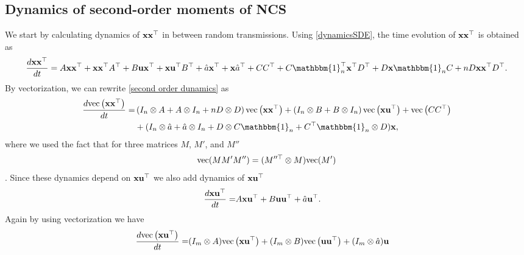 \documentclass[letterpaper, 10 pt,one column, conference]{ieeeconf}  %
\begin{document}
\subsection{Dynamics of second-order moments of NCS}
We start by calculating dynamics of $\bold x \bold x^\top$ in between random transmissions.
Using \eqref{dynamicsSDE}, the time evolution of $\bold x \bold x^\top$ is obtained as 
\begin{equation}
\begin{aligned}
\frac{d \bold{x}\bold{x}^\top}{dt}  
=    A  \bold{x}\bold{x}^\top +    \bold{x}\bold{x}^\top  A^\top  +B   \bold{u}\bold{x}^\top + \bold{x}\bold{u}^\top  B^\top   +\hat{a}\bold{x}^\top   +  \bold{x}   \hat{a}^\top +CC^\top  + C \mathbbm{1}_{n}^\top  \bold{x}^\top  D^\top + D   \bold{x}  \mathbbm{1}_{n} C +nD  \bold{x}\bold{x}^\top D^\top .
\label{second order dunamics}
\end{aligned}
\end{equation}
By vectorization, we can rewrite \eqref{second order dunamics} as
\begin{equation}\begin{aligned}
\frac{d {\rm vec}  \left( \bold x  \bold x^\top \right) }{dt } = &  \left(I_n \otimes A+  A \otimes I_n +n D\otimes D\right)   
{\rm vec}  \left( \bold x  \bold x^\top\right)  
+\left(I_n \otimes B+  B \otimes I_n \right)   
{\rm vec}  \left( \bold x  \bold u^\top\right)  + {\rm vec}  \left( CC^\top\right)  \\
& +( I _n\otimes \hat{a} + \hat{a}  \otimes I_n+D \otimes C  \mathbbm{1}_{n}+ C^\top  \mathbbm{1}_{n} \otimes D)\bold x,
\end{aligned}
\label{kronecker x2}
\end{equation} 
where we used the fact that for three matrices $M$, $M'$, and $M''$
\begin{equation}
{\rm vec}(M M' M'') = (M''^\top \otimes M){\rm vec}(M') 
\end{equation}
\cite{mao13}. Since these dynamics depend on $\bold x  \bold u^\top$ we also add dynamics of  $\bold x  \bold u^\top$
\begin{equation}
\begin{aligned}
\frac{d \bold{x}\bold{u}^\top}{dt}  
= &   A  \bold{x}\bold{u}^\top+ B  \bold{u}  \bold{u}^\top  +  \hat{a} \bold{u}^\top  .
\label{second order dunamics000}
\end{aligned}
\end{equation}
Again by using vectorization we have 
\begin{equation}
\begin{aligned}
\frac{d {\rm vec}  \left( \bold x  \bold u^\top \right) }{dt } =& ( I_m \otimes A ) {\rm vec}  \left( \bold x  \bold u^\top\right) + ( I_m \otimes B) {\rm vec}  \left( \bold u  \bold u^\top\right)  + ( I_m \otimes \hat{a} )  \bold u
\label{second order dunamics00}
\end{aligned}
\end{equation}
\end{document}
